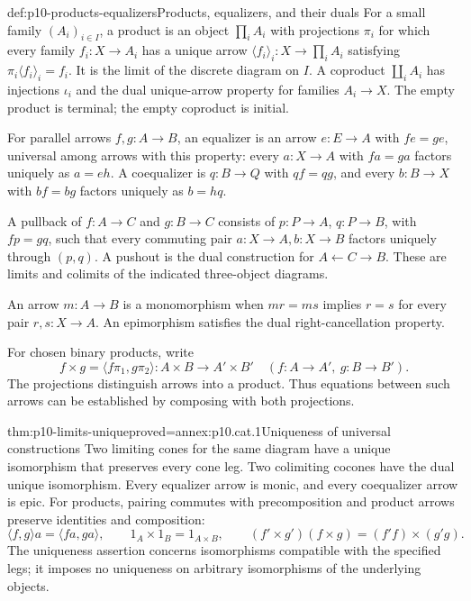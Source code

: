 \begin{hbdefinition}{def:p10-products-equalizers}{Products, equalizers, and their duals}
For a small family \((A_i)_{i\in I}\), a product is an object
\(\prod_i A_i\) with projections \(\pi_i\) for which every family
\(f_i:X\to A_i\) has a unique arrow
\(\langle f_i\rangle_i:X\to\prod_i A_i\) satisfying
\(\pi_i\langle f_i\rangle_i=f_i\).
It is the limit of the discrete diagram on \(I\).
A coproduct \(\coprod_i A_i\) has injections \(\iota_i\) and the
dual unique-arrow property for families \(A_i\to X\).
The empty product is terminal; the empty coproduct is initial.

For parallel arrows \(f,g:A\to B\), an equalizer is an arrow
\(e:E\to A\) with \(f e=g e\), universal among arrows with this
property: every \(a:X\to A\) with \(f a=g a\) factors uniquely
as \(a=e h\).
A coequalizer is \(q:B\to Q\) with \(q f=q g\), and every
\(b:B\to X\) with \(b f=b g\) factors uniquely as \(b=h q\).

A pullback of \(f:A\to C\) and \(g:B\to C\) consists of
\(p:P\to A\), \(q:P\to B\), with \(f p=g q\), such that every
commuting pair \(a:X\to A,b:X\to B\) factors uniquely through
\((p,q)\).  A pushout is the dual construction for
\(A\leftarrow C\to B\).  These are limits and colimits of the
indicated three-object diagrams.

An arrow \(m:A\to B\) is a monomorphism when
\(m r=m s\) implies \(r=s\) for every pair \(r,s:X\to A\).
An epimorphism satisfies the dual right-cancellation property.
\end{hbdefinition}

For chosen binary products, write
\[
 f\times g=\langle f\pi_1,g\pi_2\rangle:
           A\times B\longrightarrow A'\times B'
 \quad(f:A\to A',\ g:B\to B').
\]
The projections distinguish arrows into a product.  Thus equations
between such arrows can be established by composing with both
projections.

\begin{hbtheorem}{thm:p10-limits-unique}{proved=annex:p10.cat.1}{Uniqueness of universal constructions}
Two limiting cones for the same diagram have a unique isomorphism
that preserves every cone leg.  Two colimiting cocones have the
dual unique isomorphism.
Every equalizer arrow is monic, and every coequalizer arrow is epic.
For products, pairing commutes with precomposition and product
arrows preserve identities and composition:
\[
 \langle f,g\rangle a=\langle f a,g a\rangle,\qquad
 1_A\times1_B=1_{A\times B},\qquad
 (f'\times g')(f\times g)=(f'f)\times(g'g).
\]
The uniqueness assertion concerns isomorphisms compatible with
the specified legs; it imposes no uniqueness on arbitrary
isomorphisms of the underlying objects.
\end{hbtheorem}


